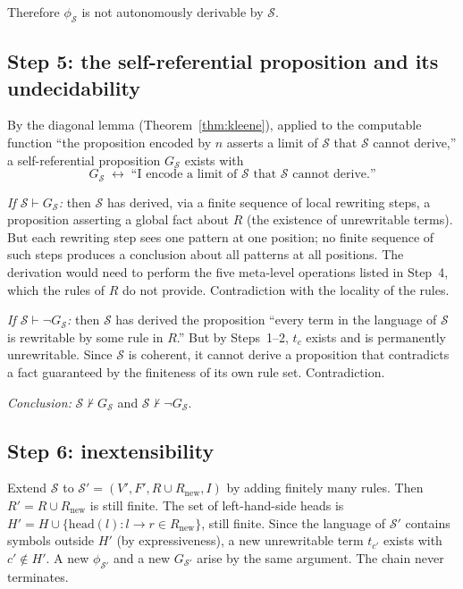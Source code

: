 \documentclass[11pt]{article}
\begin{document}
Therefore $\phi_{\mathcal{S}}$ is not autonomously derivable by
$\mathcal{S}$.

\subsection{Step 5: the self-referential proposition and its
undecidability}

By the diagonal lemma (Theorem~\ref{thm:kleene}), applied to the
computable function ``the proposition encoded by $n$ asserts a limit of
$\mathcal{S}$ that $\mathcal{S}$ cannot derive,'' a self-referential
proposition $G_{\mathcal{S}}$ exists with
\[
  G_{\mathcal{S}} \;\leftrightarrow\;
  \text{``I encode a limit of } \mathcal{S}
  \text{ that } \mathcal{S} \text{ cannot derive.''}
\]

\emph{If $\mathcal{S} \vdash G_{\mathcal{S}}$:} then $\mathcal{S}$ has
derived, via a finite sequence of local rewriting steps, a proposition
asserting a global fact about $R$ (the existence of unrewritable terms).
But each rewriting step sees one pattern at one position; no finite
sequence of such steps produces a conclusion about all patterns at all
positions. The derivation would need to perform the five meta-level
operations listed in Step~4, which the rules of $R$ do not provide.
Contradiction with the locality of the rules.

\emph{If $\mathcal{S} \vdash \neg G_{\mathcal{S}}$:} then $\mathcal{S}$
has derived the proposition ``every term in the language of $\mathcal{S}$
is rewritable by some rule in $R$.'' But by Steps~1--2, $t_c$ exists
and is permanently unrewritable. Since $\mathcal{S}$ is coherent, it
cannot derive a proposition that contradicts a fact guaranteed by the
finiteness of its own rule set. Contradiction.

\emph{Conclusion:} $\mathcal{S} \not\vdash G_{\mathcal{S}}$ and
$\mathcal{S} \not\vdash \neg G_{\mathcal{S}}$.

\subsection{Step 6: inextensibility}

Extend $\mathcal{S}$ to
$\mathcal{S}' = (V', F', R \cup R_{\mathrm{new}}, I)$ by adding
finitely many rules. Then $R' = R \cup R_{\mathrm{new}}$ is still
finite. The set of left-hand-side heads is
$H' = H \cup \{\mathrm{head}(l) : l \to r \in R_{\mathrm{new}}\}$,
still finite. Since the language of $\mathcal{S}'$ contains symbols
outside $H'$ (by expressiveness), a new unrewritable term $t_{c'}$
exists with $c' \notin H'$. A new $\phi_{\mathcal{S}'}$ and a new
$G_{\mathcal{S}'}$ arise by the same argument. The chain never
terminates.
\end{document}
